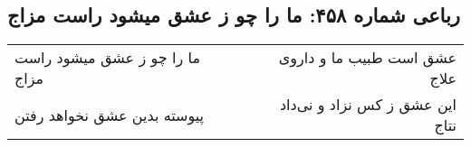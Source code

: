 \begin{center}
\section*{رباعی شماره ۴۵۸: ما را چو ز عشق میشود راست مزاج}
\label{sec:0458}
\begin{longtable}{l p{0.5cm} r}
ما را چو ز عشق میشود راست مزاج
&&
عشق است طبیب ما و داروی علاج
\\
پیوسته بدین عشق نخواهد رفتن
&&
این عشق ز کس نزاد و نی‌داد نتاج
\\
\end{longtable}
\end{center}
